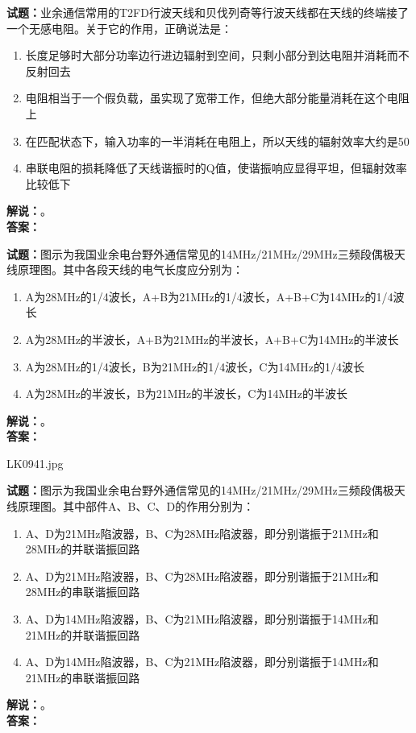 \documentclass{ctexbook}
\begin{document}
\bigskip




\noindent\textbf{试题：}业余通信常用的T2FD行波天线和贝伐列奇等行波天线都在天线的终端接了一个无感电阻。关于它的作用，正确说法是：
\begin{enumerate}[leftmargin=3em]
\item 长度足够时大部分功率边行进边辐射到空间，只剩小部分到达电阻并消耗而不反射回去
\item 电阻相当于一个假负载，虽实现了宽带工作，但绝大部分能量消耗在这个电阻上
\item 在匹配状态下，输入功率的一半消耗在电阻上，所以天线的辐射效率大约是50%
\item 串联电阻的损耗降低了天线谐振时的Q值，使谐振响应显得平坦，但辐射效率比较低下
\end{enumerate}
\noindent\textbf{解说：}\textbf{}。\\\noindent\textbf{答案：}

\bigskip




\noindent\textbf{试题：}图示为我国业余电台野外通信常见的14\unit{\MHz}/21\unit{\MHz}/29\unit{\MHz}三频段偶极天线原理图。其中各段天线的电气长度应分别为：
\begin{enumerate}[leftmargin=3em]
\item A为28\unit{\MHz}的1/4波长，A+B为21\unit{\MHz}的1/4波长，A+B+C为14\unit{\MHz}的1/4波长
\item A为28\unit{\MHz}的半波长，A+B为21\unit{\MHz}的半波长，A+B+C为14\unit{\MHz}的半波长
\item A为28\unit{\MHz}的1/4波长，B为21\unit{\MHz}的1/4波长，C为14\unit{\MHz}的1/4波长
\item A为28\unit{\MHz}的半波长，B为21\unit{\MHz}的半波长，C为14\unit{\MHz}的半波长
\end{enumerate}
\noindent\textbf{解说：}\textbf{}。\\\noindent\textbf{答案：}

\bigskip

LK0941.jpg


\noindent\textbf{试题：}图示为我国业余电台野外通信常见的14\unit{\MHz}/21\unit{\MHz}/29\unit{\MHz}三频段偶极天线原理图。其中部件A、B、C、D的作用分别为：
\begin{enumerate}[leftmargin=3em]
\item A、D为21\unit{\MHz}陷波器，B、C为28\unit{\MHz}陷波器，即分别谐振于21\unit{\MHz}和28\unit{\MHz}的并联谐振回路
\item A、D为21\unit{\MHz}陷波器，B、C为28\unit{\MHz}陷波器，即分别谐振于21\unit{\MHz}和28\unit{\MHz}的串联谐振回路
\item A、D为14\unit{\MHz}陷波器，B、C为21\unit{\MHz}陷波器，即分别谐振于14\unit{\MHz}和21\unit{\MHz}的并联谐振回路
\item A、D为14\unit{\MHz}陷波器，B、C为21\unit{\MHz}陷波器，即分别谐振于14\unit{\MHz}和21\unit{\MHz}的串联谐振回路
\end{enumerate}
\noindent\textbf{解说：}\textbf{}。\\\noindent\textbf{答案：}
\end{document}
